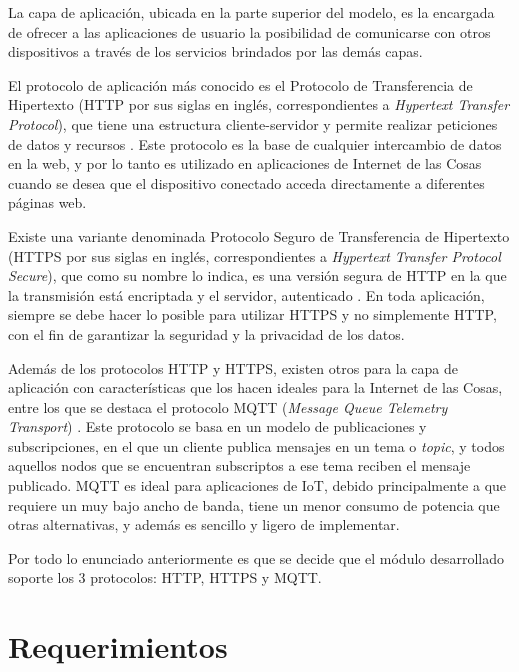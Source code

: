 La capa de aplicación, ubicada en la parte superior del modelo, es la encargada de ofrecer a las aplicaciones de usuario la posibilidad de comunicarse con otros dispositivos a través de los servicios brindados por las demás capas.

El protocolo de aplicación más conocido es el Protocolo de Transferencia de Hipertexto (HTTP por sus siglas en inglés, correspondientes a \emph{Hypertext Transfer Protocol}), que tiene una estructura cliente-servidor y permite realizar peticiones de datos y recursos \citep{http_protocol}. Este protocolo es la base de cualquier intercambio de datos en la web, y por lo tanto es utilizado en aplicaciones de Internet de las Cosas cuando se desea que el dispositivo conectado acceda directamente a diferentes páginas web.

Existe una variante denominada Protocolo Seguro de Transferencia de Hipertexto (HTTPS por sus siglas en inglés, correspondientes a \emph{Hypertext Transfer Protocol Secure}), que como su nombre lo indica, es una versión segura de HTTP en la que la transmisión está encriptada y el servidor, autenticado \citep{https_protocol}. En toda aplicación, siempre se debe hacer lo posible para utilizar HTTPS y no simplemente HTTP, con el fin de garantizar la seguridad y la privacidad de los datos.

Además de los protocolos HTTP y HTTPS, existen otros para la capa de aplicación con características que los hacen ideales para la Internet de las Cosas, entre los que se destaca el protocolo MQTT (\emph{Message Queue Telemetry Transport}) \citep{mqtt_protocol}. Este protocolo se basa en un modelo de publicaciones y subscripciones, en el que un cliente publica mensajes en un tema o \emph{topic}, y todos aquellos nodos que se encuentran subscriptos a ese tema reciben el mensaje publicado. MQTT es ideal para aplicaciones de IoT, debido principalmente a que requiere un muy bajo ancho de banda, tiene un menor consumo de potencia que otras alternativas, y además es sencillo y ligero de implementar.

Por todo lo enunciado anteriormente es que se decide que el módulo desarrollado soporte los 3 protocolos: HTTP, HTTPS y MQTT.

\section{Requerimientos}
\label{requerimientos}


